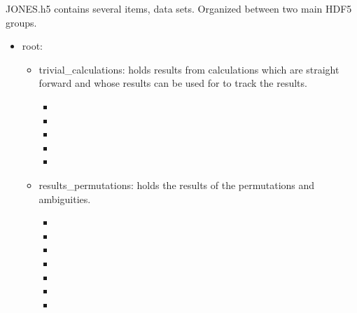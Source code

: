 \documentclass[letterpaper,12pt,english]{sphinxmanual}
\begin{document}
JONES.h5 contains several items, data sets. Organized between two main HDF5 groups.
\begin{itemize}
\item {} 
root:
\begin{itemize}
\item {} 
trivial\_calculations: holds results from calculations which are straight forward and whose results can be used for to track the results.
\begin{itemize}
\item {} 

\item {} 

\item {} 

\item {} 

\item {} 

\end{itemize}

\item {} 
results\_permutations: holds the results of the permutations and ambiguities.
\begin{itemize}
\item {} 

\item {} 

\item {} 

\item {} 

\item {} 

\item {} 

\item {} 

\end{itemize}

\end{itemize}

\end{itemize}
\end{document}
